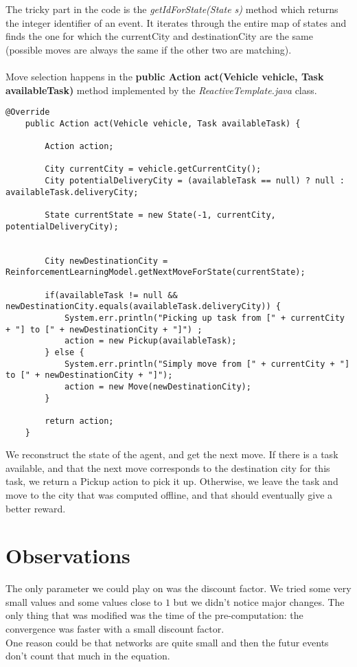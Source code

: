 \documentclass[fontsize=12pt]{scrartcl} %
\begin{document}
The tricky part in the code is the \textit{getIdForState(State s)} method which returns the integer identifier of an event. It iterates through the entire map of states and finds the one for which the currentCity and destinationCity are the same (possible moves are always the same if the other two are matching). \\ \\

Move selection happens in the \textbf{public Action act(Vehicle vehicle, Task availableTask)} method implemented by the \textit{ReactiveTemplate.java} class.

\begin{lstlisting}[breaklines]
	@Override
	public Action act(Vehicle vehicle, Task availableTask) {
		
		Action action;
		
		City currentCity = vehicle.getCurrentCity();
		City potentialDeliveryCity = (availableTask == null) ? null : availableTask.deliveryCity;
		
		State currentState = new State(-1, currentCity, potentialDeliveryCity);
		
		
		City newDestinationCity = ReinforcementLearningModel.getNextMoveForState(currentState);
		
		if(availableTask != null && newDestinationCity.equals(availableTask.deliveryCity)) {
			System.err.println("Picking up task from [" + currentCity + "] to [" + newDestinationCity + "]") ;
			action = new Pickup(availableTask);
		} else {
			System.err.println("Simply move from [" + currentCity + "] to [" + newDestinationCity + "]");
			action = new Move(newDestinationCity);
		}
		
		return action; 
	}
\end{lstlisting}
 
We reconstruct the state of the agent, and get the next move. If there is a task available, and that the next move corresponds to the destination city for this task, we return a Pickup action to pick it up. Otherwise, we leave the task and move to the city that was computed offline, and that should eventually give a better reward.

\section*{Observations}
The only parameter we could play on was the discount factor. We tried some very small values and some values close to $1$ but we didn't notice major changes. The only thing that was modified was the time of the pre-computation: the convergence was faster with a small discount factor.\\
One reason could be that networks are quite small and then the futur events don't count that much in the equation.
\end{document}
